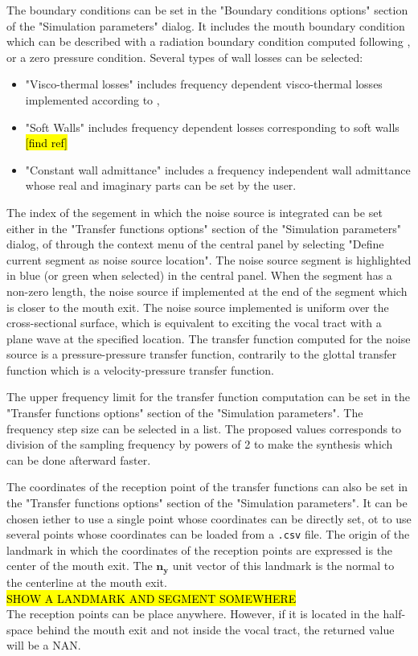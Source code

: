 \documentclass[]{article}
\begin{document}
	The boundary conditions can be set in the "Boundary conditions options" section of the "Simulation parameters" dialog. 
	It includes the mouth boundary condition which can be described
	with a radiation boundary condition computed following 
	\textcite{blandin2019multimodal},
	or a zero pressure condition.
	Several types of wall losses can be selected: 
	\begin{itemize}
		\item "Visco-thermal losses" includes frequency dependent 
		visco-thermal losses implemented according to 
		\textcite{bruneau1987boundary},
		\item "Soft Walls" includes frequency dependent losses 
		corresponding to soft walls \hl{[find ref]}
		\item "Constant wall admittance" includes a frequency
		independent wall admittance whose real and imaginary parts 
		can be set by the user.
	\end{itemize}

	The index of the segement in which the noise source is integrated can be 
	set either in the "Transfer functions options" section of the "Simulation parameters"
	dialog, of through the context menu of the central panel by selecting 
	"Define current segment as noise source location". 
	The noise source segment is highlighted in blue (or green when selected) in the 
	central panel.
	When the segment has a non-zero length, the noise source if implemented at 
	the end of the segment which is closer to the mouth exit.
	The noise source implemented is uniform over the cross-sectional surface, which
	is equivalent to exciting the vocal tract with a plane wave at the specified location.
	The transfer function computed for the noise source is a pressure-pressure 
	transfer function, contrarily to the glottal transfer function which is a 
	velocity-pressure transfer function.
	
	The upper frequency limit for the transfer function computation can be set
	in the "Transfer functions options" section of the "Simulation parameters".
	The frequency step size can be selected in a list. 
	The proposed values corresponds to division of the sampling frequency by powers
	of 2 to make the synthesis which can be done afterward faster.
	
	The coordinates of the reception point of the transfer functions can also be set
	in the "Transfer functions options" section of the "Simulation parameters".
	It can be chosen iether to use a single point whose coordinates can be 
	directly set, ot to use several points whose coordinates can be loaded from
	a \texttt{.csv} file. 
	The origin of the landmark in which the coordinates of the reception points are
	expressed is the center of the mouth exit. 
	The $\bm{n_y}$ unit vector of this landmark is the normal to the centerline
	at the mouth exit.
	\\ \hl{SHOW A LANDMARK AND SEGMENT SOMEWHERE} \\
	The reception points can be place anywhere. 
	However, if it is located in the half-space behind the mouth exit and not 
	inside the vocal tract, the returned value will be a NAN.
	
\end{document}

